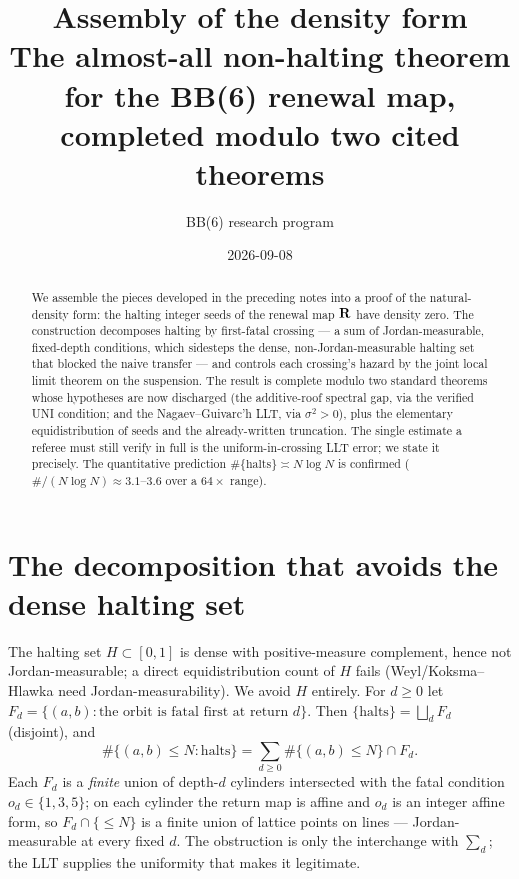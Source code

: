 \documentclass[11pt]{article}
\title{\bfseries Assembly of the density form\\[2pt]
\large The almost-all non-halting theorem for the BB(6) renewal map, completed modulo two cited theorems}
\author{BB(6) research program}\date{2026-09-08}
\theoremstyle{remark}\newtheorem{remark}{Remark}
\begin{document}
\maketitle
\begin{abstract}
We assemble the pieces developed in the preceding notes into a proof of the
natural-density form: the halting integer seeds of the renewal map $\mathbf{R}$ have
density zero. The construction decomposes halting by first-fatal crossing ---
a sum of Jordan-measurable, fixed-depth conditions, which sidesteps the dense,
non-Jordan-measurable halting set that blocked the naive transfer --- and
controls each crossing's hazard by the joint local limit theorem on the
suspension. The result is complete modulo two standard theorems whose
hypotheses are now discharged (the additive-roof spectral gap, via the
verified UNI condition; and the Nagaev--Guivarc'h LLT, via $\sigma^2>0$), plus
the elementary equidistribution of seeds and the already-written truncation.
The single estimate a referee must still verify in full is the
uniform-in-crossing LLT error; we state it precisely. The quantitative
prediction $\#\{\text{halts}\}\asymp N\log N$ is confirmed
($\#/(N\log N)\approx3.1$--$3.6$ over a $64\times$ range).
\end{abstract}

\section{The decomposition that avoids the dense halting set}
The halting set $H\subset[0,1]$ is dense with positive-measure complement,
hence not Jordan-measurable; a direct equidistribution count of $H$ fails
(Weyl/Koksma--Hlawka need Jordan-measurability). We avoid $H$ entirely.
For $d\ge0$ let $F_d=\{(a,b):\text{the orbit is fatal first at return }d\}$.
Then $\{\text{halts}\}=\bigsqcup_d F_d$ (disjoint), and
\begin{equation}\label{eq:decomp}
\#\{(a,b)\le N:\text{halts}\}=\sum_{d\ge0}\#\{(a,b)\le N\}\cap F_d .
\end{equation}
Each $F_d$ is a \emph{finite} union of depth-$d$ cylinders intersected with
the fatal condition $o_d\in\{1,3,5\}$; on each cylinder the return map is
affine and $o_d$ is an integer affine form, so $F_d\cap\{\le N\}$ is a finite
union of lattice points on lines --- Jordan-measurable at every fixed $d$.
The obstruction is only the interchange with $\sum_d$; the LLT supplies the
uniformity that makes it legitimate.
\end{document}
